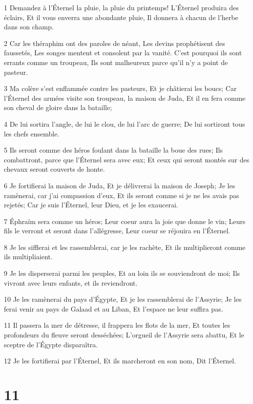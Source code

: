 \par 1 Demandez à l'Éternel la pluie, la pluie du printemps! L'Éternel produira des éclairs, Et il vous enverra une abondante pluie, Il donnera à chacun de l'herbe dans son champ.
\par 2 Car les théraphim ont des paroles de néant, Les devins prophétisent des faussetés, Les songes mentent et consolent par la vanité. C'est pourquoi ils sont errants comme un troupeau, Ils sont malheureux parce qu'il n'y a point de pasteur.
\par 3 Ma colère s'est enflammée contre les pasteurs, Et je châtierai les boucs; Car l'Éternel des armées visite son troupeau, la maison de Juda, Et il en fera comme son cheval de gloire dans la bataille;
\par 4 De lui sortira l'angle, de lui le clou, de lui l'arc de guerre; De lui sortiront tous les chefs ensemble.
\par 5 Ils seront comme des héros foulant dans la bataille la boue des rues; Ils combattront, parce que l'Éternel sera avec eux; Et ceux qui seront montés sur des chevaux seront couverts de honte.
\par 6 Je fortifierai la maison de Juda, Et je délivrerai la maison de Joseph; Je les ramènerai, car j'ai compassion d'eux, Et ils seront comme si je ne les avais pas rejetés; Car je suis l'Éternel, leur Dieu, et je les exaucerai.
\par 7 Éphraïm sera comme un héros; Leur coeur aura la joie que donne le vin; Leurs fils le verront et seront dans l'allégresse, Leur coeur se réjouira en l'Éternel.
\par 8 Je les sifflerai et les rassemblerai, car je les rachète, Et ils multiplieront comme ils multipliaient.
\par 9 Je les disperserai parmi les peuples, Et au loin ils se souviendront de moi; Ils vivront avec leurs enfants, et ils reviendront.
\par 10 Je les ramènerai du pays d'Égypte, Et je les rassemblerai de l'Assyrie; Je les ferai venir au pays de Galaad et au Liban, Et l'espace ne leur suffira pas.
\par 11 Il passera la mer de détresse, il frappera les flots de la mer, Et toutes les profondeurs du fleuve seront desséchées; L'orgueil de l'Assyrie sera abattu, Et le sceptre de l'Égypte disparaîtra.
\par 12 Je les fortifierai par l'Éternel, Et ils marcheront en son nom, Dit l'Éternel.

\chapter{11}

